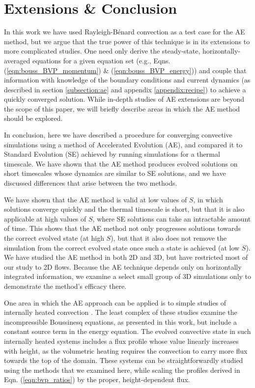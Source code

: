 \documentclass[aps, pre, onecolumn, nofootinbib, notitlepage, groupedaddress, amsfonts, amssymb, amsmath, longbibliography]{revtex4-1}
\newcommand{\RB}{Rayleigh-B\'{e}nard }
\begin{document}


\section{Extensions \& Conclusion}
\label{sec:extensions}
In this work we have used \RB convection as a test case for the AE method, but we argue that
the true power of this technique is in its extensions to more complicated studies.
One need only derive the steady-state, horizontally-averaged equations for a given
equation set (e.g., Eqns. (\ref{eqn:bouss_BVP_momentum}) \& (\ref{eqn:bouss_BVP_energy}))
and couple that information with knowledge of the boundary conditions
and current dynamics (as described in
section \ref{subsection:ae} and appendix \ref{appendix:recipe}) to achieve a quickly
converged solution. While in-depth studies of AE extensions are beyond the 
scope of this paper, we will briefly describe
areas in which the AE method should be explored.

In conclusion, here we have described a procedure for converging convective simulations using
a method of Accelerated Evolution (AE), and compared it to Standard
Evolution (SE) achieved by running simulations for a thermal timescale.
We have shown that the AE method produces evolved solutions on short timescales
whose dynamics are similar to SE solutions, and we have discussed differences that arise
between the two methods.

We have shown that the AE method is valid at low values of $S$, in which solutions
converge quickly and the thermal timescale is short, but that it is also applicable
at high values of $S$, where SE solutions can take an
intractable amount of time. This shows that the AE method not only progresses
solutions towards the correct evolved state (at high $S$), but that it also does not
remove the simulation from the correct evolved state once such a state is achieved (at low $S$). 
We have studied
the AE method in both 2D and 3D, but have restricted most of our study to 2D flows.
Because the AE technique depends only on horizontally integrated information, 
we examine a select small group
of 3D simulations only to demonstrate the method's efficacy there.

One area in which the AE approach can be applied is to simple studies of
internally heated convection \cite{goluskin2016}.  The least complex of these studies 
examine the incompressible Boussinesq equations, as presented in this work,
but include a constant source term in the energy equation. The evolved convective
state in such internally heated systems includes a flux profile whose value linearly
increases with height, as the volumetric heating requires the convection to carry
more flux towards the top of the domain.  These systems can be straightforwardly
studied using the methods that we examined here, while scaling the profiles derived
in Eqn. (\ref{eqn:bvp_ratios}) by the proper, height-dependent flux.
\end{document}
